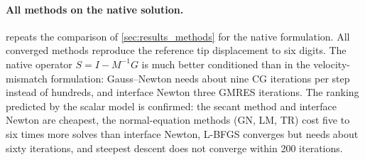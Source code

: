 \documentclass[11pt,a4paper]{article}
\theoremstyle{definition}
\theoremstyle{remark}
\newcommand{\M}{M}
\begin{document}
\begin{table}[ht]\centering
\caption{Native-traction formulation, 4 processes; ratio of $d_x(0.01)$ to the reference.}
\label{tab:native}
\end{table}




\paragraph{All methods on the native solution.}  repeats the comparison of
\cref{sec:results_methods} for the native formulation. All converged methods reproduce the
reference tip displacement to six digits. The native operator $S=I-\M^{-1}G$ is much better
conditioned than in the velocity-mismatch formulation: Gauss--Newton needs about nine CG iterations
per step instead of hundreds, and interface Newton three GMRES iterations. The ranking predicted by
the scalar model is confirmed: the secant method and interface Newton are cheapest, the
normal-equation methods (GN, LM, TR) cost five to six times more solves than interface Newton,
L-BFGS converges but needs about sixty iterations, and steepest descent does not converge within
200 iterations.
\end{document}
